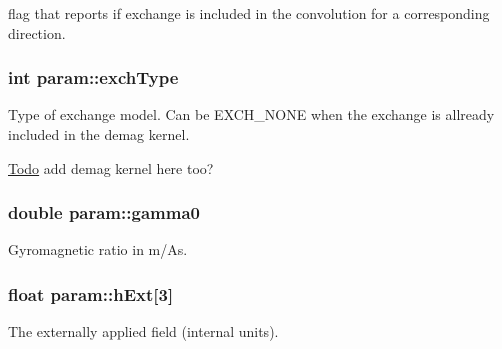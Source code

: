 flag that reports if exchange is included in the convolution for a corresponding direction. 

\hypertarget{structparam_a7274904db5b3421e22e323af7d1d7563}{
\subsubsection[{exchType}]{\setlength{\rightskip}{0pt plus 5cm}int {\bf param::exchType}}}
\label{structparam_a7274904db5b3421e22e323af7d1d7563}


Type of exchange model. Can be EXCH\_\-NONE when the exchange is allready included in the demag kernel. 

\begin{Desc}
\item[\hyperlink{todo__todo000021}{Todo}]add demag kernel here too? \end{Desc}
\hypertarget{structparam_ab864c16cb577a5f26214b21dda24ffc7}{
\subsubsection[{gamma0}]{\setlength{\rightskip}{0pt plus 5cm}double {\bf param::gamma0}}}
\label{structparam_ab864c16cb577a5f26214b21dda24ffc7}


Gyromagnetic ratio in m/As. 

\hypertarget{structparam_a45391a3b3e3f3515e32a9f9020f65316}{
\subsubsection[{hExt}]{\setlength{\rightskip}{0pt plus 5cm}float {\bf param::hExt}\mbox{[}3\mbox{]}}}
\label{structparam_a45391a3b3e3f3515e32a9f9020f65316}


The externally applied field (internal units). 

